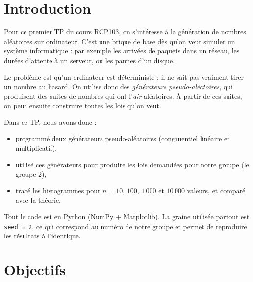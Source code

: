 \documentclass[11pt,a4paper]{article}
\begin{document}
\tableofcontents
\newpage

\section{Introduction}

Pour ce premier TP du cours RCP103, on s'int\'eresse \`a la g\'en\'eration de
nombres al\'eatoires sur ordinateur. C'est une brique de base d\`es qu'on veut
simuler un syst\`eme informatique : par exemple les arriv\'ees de paquets dans
un r\'eseau, les dur\'ees d'attente \`a un serveur, ou les pannes d'un disque.

Le probl\`eme est qu'un ordinateur est d\'eterministe : il ne sait pas vraiment
tirer un nombre au hasard. On utilise donc des \emph{g\'en\'erateurs
pseudo-al\'eatoires}, qui produisent des suites de nombres qui ont l'\emph{air}
al\'eatoires. \`A partir de ces suites, on peut ensuite construire toutes les
lois qu'on veut.

Dans ce TP, nous avons donc :
\begin{itemize}
    \item programm\'e deux g\'en\'erateurs pseudo-al\'eatoires (congruentiel
          lin\'eaire et multiplicatif),
    \item utilis\'e ces g\'en\'erateurs pour produire les lois demand\'ees pour
          notre groupe (le groupe 2),
    \item trac\'e les histogrammes pour $n = 10$, $100$, $1\,000$ et $10\,000$
          valeurs, et compar\'e avec la th\'eorie.
\end{itemize}

Tout le code est en Python (NumPy + Matplotlib). La graine utilis\'ee partout
est \texttt{seed = 2}, ce qui correspond au num\'ero de notre groupe et permet
de reproduire les r\'esultats \`a l'identique.

\section{Objectifs}
\end{document}
